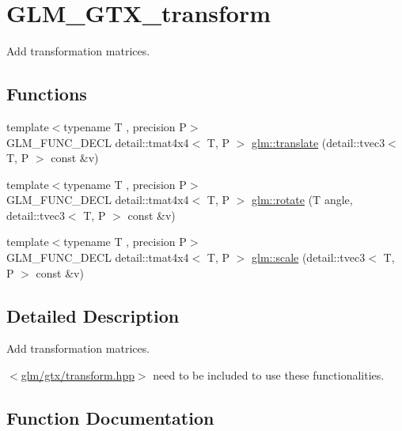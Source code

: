 \hypertarget{group__gtx__transform}{}\section{G\+L\+M\+\_\+\+G\+T\+X\+\_\+transform}
\label{group__gtx__transform}


Add transformation matrices.  


\subsection*{Functions}
\begin{DoxyCompactItemize}
\item 
{\footnotesize template$<$typename T , precision P$>$ }\\G\+L\+M\+\_\+\+F\+U\+N\+C\+\_\+\+D\+E\+CL detail\+::tmat4x4$<$ T, P $>$ \hyperlink{group__gtx__transform_ga8a2efce0917bf301cc0ea7afb428f688}{glm\+::translate} (detail\+::tvec3$<$ T, P $>$ const \&v)
\item 
{\footnotesize template$<$typename T , precision P$>$ }\\G\+L\+M\+\_\+\+F\+U\+N\+C\+\_\+\+D\+E\+CL detail\+::tmat4x4$<$ T, P $>$ \hyperlink{group__gtx__transform_gaac4ccdbf699a62fe6429005512c0cda5}{glm\+::rotate} (T angle, detail\+::tvec3$<$ T, P $>$ const \&v)
\item 
{\footnotesize template$<$typename T , precision P$>$ }\\G\+L\+M\+\_\+\+F\+U\+N\+C\+\_\+\+D\+E\+CL detail\+::tmat4x4$<$ T, P $>$ \hyperlink{group__gtx__transform_ga80eb26a1eb382b7ab1e3631532d21103}{glm\+::scale} (detail\+::tvec3$<$ T, P $>$ const \&v)
\end{DoxyCompactItemize}


\subsection{Detailed Description}
Add transformation matrices. 

$<$\hyperlink{transform_8hpp}{glm/gtx/transform.\+hpp}$>$ need to be included to use these functionalities. 

\subsection{Function Documentation}

